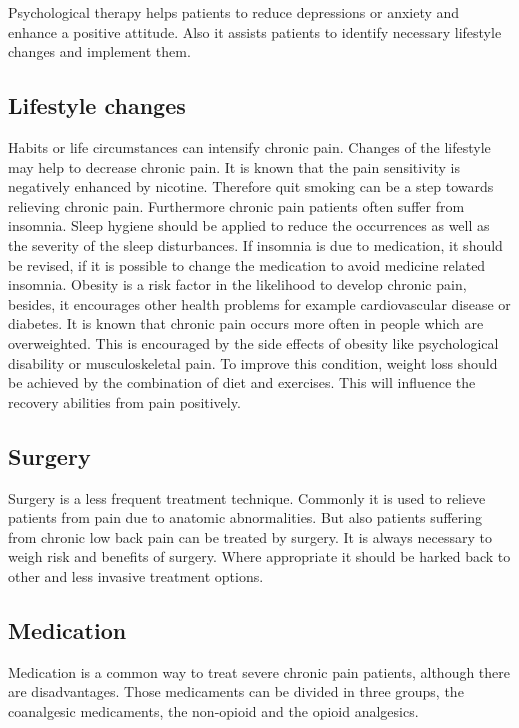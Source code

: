 Psychological therapy helps patients to reduce depressions or anxiety and enhance a positive attitude. Also it assists patients to identify necessary lifestyle changes and implement them.

\subsection{Lifestyle changes}

Habits or life circumstances can intensify chronic pain. Changes of the lifestyle may help to decrease chronic pain. It is known that the pain sensitivity is negatively enhanced by nicotine. Therefore quit smoking can be a step towards relieving chronic pain.
Furthermore chronic pain patients often suffer from insomnia. Sleep hygiene should be applied to reduce the occurrences as well as the severity of the sleep disturbances. If insomnia is due to medication, it should be revised, if it is possible to change the medication to avoid medicine related insomnia.
Obesity is a risk factor in the likelihood to  develop chronic pain, besides, it encourages other health problems for example cardiovascular disease or diabetes. It is known that chronic pain occurs more often in people which are overweighted. This is encouraged by the side effects of obesity like psychological disability or musculoskeletal pain. To improve this condition, weight loss should be achieved by the combination of diet and exercises. This will influence the recovery abilities from pain positively. \cite{marcus2009,pope2017}

\subsection{Surgery}

Surgery is a less frequent treatment technique. Commonly it is used to relieve patients from pain due to anatomic abnormalities. \cite{marcus2009,pope2017} But also patients suffering from chronic low back pain can be treated by surgery. It is always necessary to weigh risk and benefits of surgery. Where appropriate it should be harked back to other and less invasive treatment options. \cite{pope2017}

\subsection{Medication}

Medication is a common way to treat severe chronic pain patients, although there are disadvantages. Those medicaments can be divided in three groups, the coanalgesic medicaments, the non-opioid and the opioid analgesics. \cite{marcus2009}

